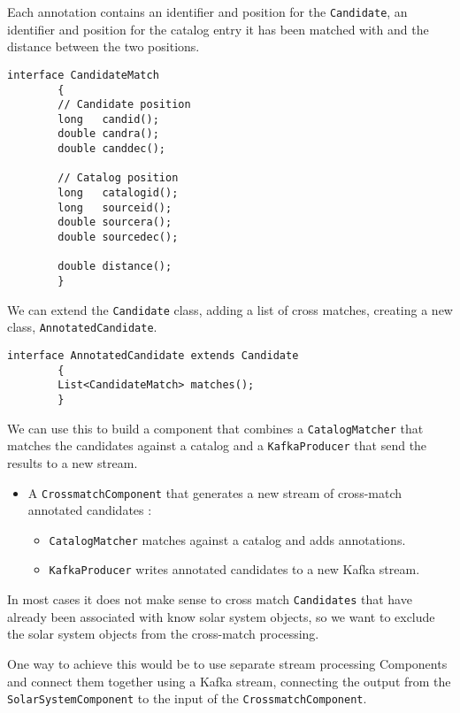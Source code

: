 \documentclass{article}
\newcommand{\kafka} {Kafka\xspace}
\begin{document}
Each annotation contains an identifier and position for the \texttt{Candidate}, an identifier and position for the catalog entry it has been matched with and the distance between the two positions.

\begin{lstlisting}[style=Java]
    interface CandidateMatch
        {
        // Candidate position
        long   candid();
        double candra();
        double canddec();

        // Catalog position
        long   catalogid();
        long   sourceid();
        double sourcera();
        double sourcedec();

        double distance();
        }
\end{lstlisting}

We can extend the \texttt{Candidate} class, adding a list of cross matches, creating a new class, \texttt{AnnotatedCandidate}.

\begin{lstlisting}[style=Java]
    interface AnnotatedCandidate extends Candidate
        {
        List<CandidateMatch> matches();
        }
\end{lstlisting}

We can use this to build a component that combines a \texttt{CatalogMatcher} that matches the candidates against a catalog and a \texttt{KafkaProducer} that send the results to a new stream.

\begin{itemize}
    \item A \texttt{CrossmatchComponent} that generates a new stream of cross-match annotated candidates :
    \begin{itemize}
        \item \texttt{CatalogMatcher} matches against a catalog and adds annotations.
    \end{itemize}
    \begin{itemize}
        \item \texttt{KafkaProducer} writes annotated candidates to a new Kafka stream.
    \end{itemize}
\end{itemize}

In most cases it does not make sense to cross match \texttt{Candidates} that have already been associated with know solar system objects, so we want to exclude the solar system objects from the cross-match processing.

One way to achieve this would be to use separate stream processing Components and connect them together using a \kafka stream, connecting the output from the \texttt{SolarSystemComponent} to the input of the \texttt{CrossmatchComponent}.
\end{document}
